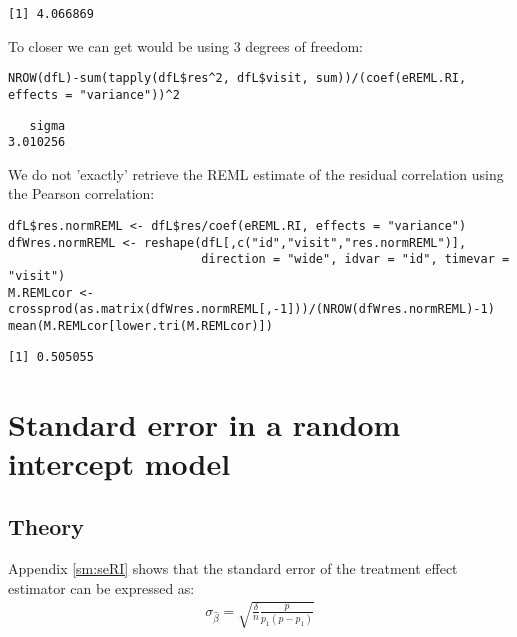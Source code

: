 \documentclass[12pt]{article}
\begin{document}
\begin{verbatim}
[1] 4.066869
\end{verbatim}


To closer we can get would be using 3 degrees of freedom:
\lstset{language=r,label= ,caption= ,captionpos=b,numbers=none}
\begin{lstlisting}
NROW(dfL)-sum(tapply(dfL$res^2, dfL$visit, sum))/(coef(eREML.RI, effects = "variance"))^2
\end{lstlisting}

\begin{verbatim}
   sigma 
3.010256
\end{verbatim}



We do not 'exactly' retrieve the REML estimate of the residual
correlation using the Pearson correlation:
\lstset{language=r,label= ,caption= ,captionpos=b,numbers=none}
\begin{lstlisting}
dfL$res.normREML <- dfL$res/coef(eREML.RI, effects = "variance")
dfWres.normREML <- reshape(dfL[,c("id","visit","res.normREML")],
                           direction = "wide", idvar = "id", timevar = "visit")
M.REMLcor <- crossprod(as.matrix(dfWres.normREML[,-1]))/(NROW(dfWres.normREML)-1)
mean(M.REMLcor[lower.tri(M.REMLcor)])
\end{lstlisting}

\begin{verbatim}
[1] 0.505055
\end{verbatim}


\clearpage

\section{Standard error in a random intercept model}
\label{sec:org270ebd1}

\subsection{Theory}
\label{sec:org8bd7f58}

Appendix \ref{sm:seRI} shows that the standard error of the treatment
effect estimator can be expressed as:
\begin{align*}
\sigma_{\widehat{\beta}} =\sqrt{\frac{\delta}{n} \frac{p}{p_1(p-p_1)}}
\end{align*}
\end{document}
